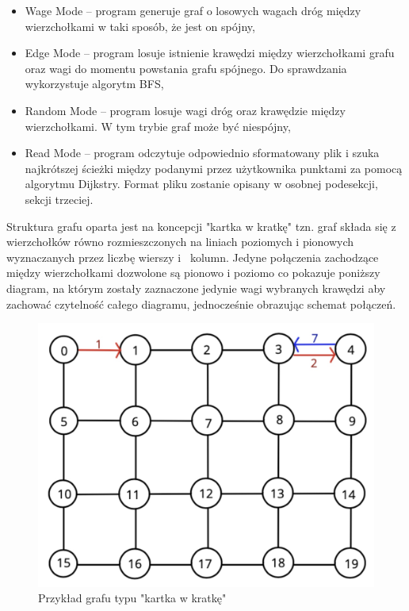 \documentclass[10pt, a4paper]{report}
\begin{document}
    \begin{itemize}
        \item Wage Mode – program generuje graf o losowych wagach dróg między wierzchołkami w taki sposób, że jest on spójny,
        \item Edge Mode – program losuje istnienie krawędzi między wierzchołkami grafu oraz wagi do momentu powstania 
        grafu spójnego. Do sprawdzania wykorzystuje algorytm BFS,
        \item Random Mode – program losuje wagi dróg oraz krawędzie między wierzchołkami. W tym trybie graf może być niespójny,
        \item Read Mode -- program odczytuje odpowiednio sformatowany plik i szuka najkrótszej ścieżki
        między podanymi przez użytkownika punktami za pomocą algorytmu Dijkstry. Format pliku zostanie opisany w osobnej podesekcji, sekcji trzeciej.
    \end{itemize}
    Struktura grafu oparta jest na koncepcji "kartka w kratkę" tzn. graf składa się z wierzchołków równo rozmieszczonych na liniach poziomych 
    i pionowych wyznaczanych przez liczbę wierszy i~ kolumn. Jedyne połączenia zachodzące między wierzchołkami dozwolone są  pionowo i poziomo co pokazuje poniższy diagram, na którym zostały zaznaczone jedynie wagi wybranych krawędzi aby zachować czytelność całego diagramu, jednocześnie obrazując schemat połączeń.
    \begin{figure}[ht]
        \begin{center}
            \includegraphics[scale=0.15]{graph.png}
            \caption{Przykład grafu typu "kartka w kratkę"}
        \end{center}
    \end{figure}
\end{document}
